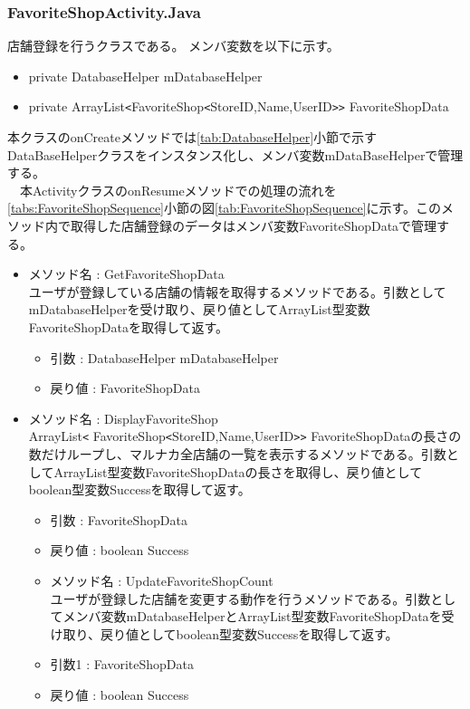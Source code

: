 \documentclass[a4j]{jarticle}
\begin{document}
\subsubsection{FavoriteShopActivity.Java}
\label{tab:FavoriteShop}
店舗登録を行うクラスである。%
メンバ変数を以下に示す。
\begin{itemize}
\item private DatabaseHelper mDatabaseHelper
\item private ArrayList\verb|<|FavoriteShop\verb|<|StoreID,Name,UserID\verb|>>| FavoriteShopData
\end{itemize}
本クラスのonCreateメソッドでは\ref{tab:DatabaseHelper}小節で示すDataBaseHelperクラスをインスタンス化し、メンバ変数mDataBaseHelperで管理する。\\
　本ActivityクラスのonResumeメソッドでの処理の流れを\ref{tabs:FavoriteShopSequence}小節の図\ref{tab:FavoriteShopSequence}に示す。このメソッド内で取得した店舗登録のデータはメンバ変数FavoriteShopDataで管理する。

\begin{itemize}
\item  メソッド名 : GetFavoriteShopData\\
  ユーザが登録している店舗の情報を取得するメソッドである。引数としてmDatabaseHelperを受け取り、戻り値としてArrayList型変数FavoriteShopDataを取得して返す。
  \begin{itemize}
  \item 引数 : DatabaseHelper mDatabaseHelper
  \item 戻り値 : FavoriteShopData
  \end{itemize}

\item メソッド名 : DisplayFavoriteShop\\
  ArrayList\verb|<| FavoriteShop\verb|<|StoreID,Name,UserID\verb|>>| FavoriteShopDataの長さの数だけループし、マルナカ全店舗の一覧を表示するメソッドである。引数としてArrayList型変数FavoriteShopDataの長さを取得し、戻り値としてboolean型変数Successを取得して返す。
  \begin{itemize}
  \item 引数 : FavoriteShopData
  \item 戻り値 : boolean Success
  \end{itemize}

\begin{itemize}
\item メソッド名 : UpdateFavoriteShopCount\\
  ユーザが登録した店舗を変更する動作を行うメソッドである。引数としてメンバ変数mDatabaseHelperとArrayList型変数FavoriteShopDataを受け取り、戻り値としてboolean型変数Successを取得して返す。
  \item 引数1 : FavoriteShopData
  \item 戻り値 : boolean Success
  \end{itemize}
\end{itemize}
\end{document}
